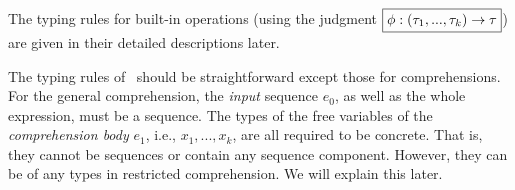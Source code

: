 

The typing rules for built-in operations (using the judgment $\boxed{\phi : (\tau_1,...,\tau_{k}) \rightarrow \tau}$) are given in their detailed descriptions later.


The typing rules of \mysnesl \ should be straightforward except those for comprehensions.
For the general comprehension, the \emph{input} sequence $e_0$, as well as the whole expression, must be a sequence.
The types of the free variables of the \emph{comprehension body} $e_1$, i.e., $x_1,...,x_k$, are all required to be concrete. 
That is, they cannot be sequences or contain any sequence component.
However, they can be of any types in restricted comprehension.
We will explain this later.
 
